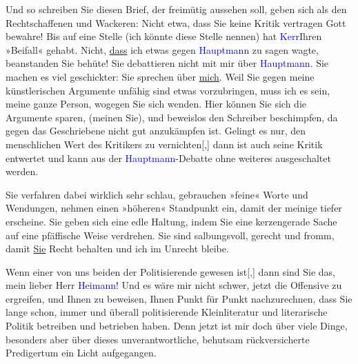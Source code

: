 \pstart
           Und so schreiben Sie diesen Brief, der freimütig aussehen soll, geben sich als den
               Rechtschaffenen und Wackeren: Nicht etwa, dass Sie keine Kritik vertragen {\dotstwo} Gott bewahre! Bis auf eine Stelle (ich könnte diese
               Stelle nennen) hat 
               \textcolor{blue}{Kerr}{}\ledrightnote{\textcolor{blue}{Alfred Kerr}}{ }{\pb}Ihren »Beifall« gehabt. Nicht,
                  \uline{dass} ich etwas gegen \textcolor{blue}{Hauptmann}{}\ledrightnote{\textcolor{blue}{Gerhart Hauptmann}} zu sagen wagte, beanstanden Sie {\dotstwo} behüte! Sie debattieren nicht mit mir über \textcolor{blue}{Hauptmann}{}\ledrightnote{\textcolor{blue}{Gerhart Hauptmann}}. Sie machen es viel geschickter: Sie
               sprechen über \uline{mich}. Weil Sie gegen meine
               künstlerischen Argumente unfähig sind etwas vorzubringen, muss ich es sein, meine
               ganze Person, wogegen Sie sich wenden. Hier können Sie sich die Argumente sparen,
               (meinen Sie), und beweislos den Schreiber beschimpfen, da gegen das Geschriebene
               nicht gut anzukämpfen ist. Gelingt es nur, den menschlichen Wert des Kritikers zu
                  vernichten{[},{]} dann ist auch seine Kritik entwertet und kann aus der \textcolor{blue}{Hauptmann}{}\ledrightnote{\textcolor{blue}{Gerhart Hauptmann}}-Debatte ohne weiteres ausgeschaltet
               werden.\pend
           
\pstart
           Sie verfahren dabei wirklich sehr schlau, gebrauchen »feine« Worte und Wendungen,
               nehmen einen »höheren« Standpunkt ein, damit der meinige tiefer erscheine. Sie geben
               sich eine edle Haltung, indem Sie eine kerzengerade Sache auf eine pfäffische Weise
               verdrehen. Sie sind salbungsvoll, gerecht und fromm, damit \uline{Sie} Recht behalten und ich im Unrecht bleibe.\pend
           
\pstart
           Wenn einer von uns beiden der Politisierende gewesen ist{[},{]} dann
               sind Sie das, mein lieber Herr \textcolor{blue}{Heimann}{}\ledrightnote{\textcolor{blue}{Moritz Heimann}}! Und es
               wäre mir nicht schwer, jetzt die Offensive zu ergreifen, und Ihnen zu beweisen, Ihnen
               Punkt für Punkt nachzurechnen, dass Sie lange schon, immer und überall politisierende Kleinliteratur und
               literarische Politik betreiben und betrieben haben. Denn jetzt ist mir doch über
               viele Dinge, besonders aber über dieses unverantwortliche, behutsam rückversicherte
               Predigertum ein Licht aufgegangen.\pend
           
